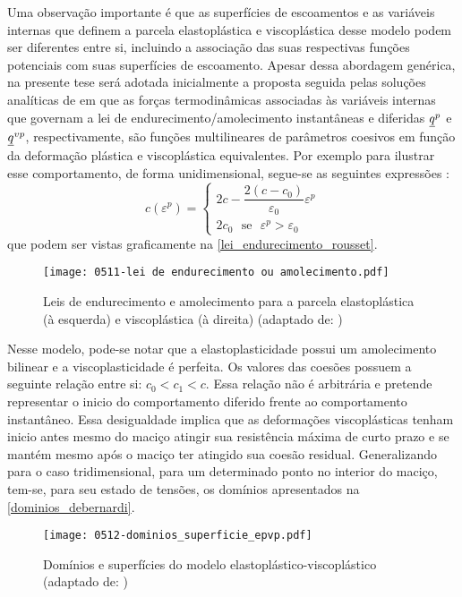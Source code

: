 Uma observação importante é que as superfícies de escoamentos e as variáveis internas que definem a parcela elastoplástica e viscoplástica desse modelo podem ser diferentes entre si, incluindo a associação das suas respectivas funções potenciais com suas superfícies de escoamento. Apesar dessa abordagem genérica, na presente tese será adotada inicialmente a proposta seguida pelas soluções analíticas de  em que as forças termodinâmicas associadas às variáveis internas que governam a lei de endurecimento/amolecimento instantâneas e diferidas $\underline q^p$ e $\underline q^{vp}$, respectivamente, são funções multilineares de parâmetros coesivos em função da deformação plástica e viscoplástica equivalentes. Por exemplo para ilustrar esse comportamento, de forma unidimensional, segue-se as seguintes expressões \cite[p. 220]{Rousset1988}:
\begin{equation}
	\label{eq:qp_rousset}
	c(\varepsilon^p) = \left\{
		\begin{array}{lcl}
			2c - \dfrac{2(c-c_0)}{\varepsilon_0}\varepsilon^p \\ 
			2c_0~~~\text{se}~~~\varepsilon^p > \varepsilon_0
		\end{array}
	\right.
\end{equation}
que podem ser vistas graficamente na \autoref{lei_endurecimento_rousset}.
\begin{figure}[H]
	\begin{center}
		\texttt{[image: 0511-lei de endurecimento ou amolecimento.pdf]}
	\end{center}
	\caption{\label{lei_endurecimento_rousset}Leis de endurecimento e amolecimento para a parcela elastoplástica (à esquerda) e viscoplástica (à direita) (adaptado de: )}
\end{figure}
Nesse modelo, pode-se notar que a elastoplasticidade possui um amolecimento bilinear e a viscoplasticidade é perfeita. Os valores das coesões possuem a seguinte relação entre si: $c_0 < c_1 < c$. Essa relação não é arbitrária e pretende representar o inicio do comportamento diferido frente ao comportamento instantâneo. Essa desigualdade implica que as deformações viscoplásticas tenham inicio antes mesmo do maciço atingir sua resistência máxima de curto prazo e se mantém mesmo após o maciço ter atingido sua coesão residual. Generalizando para o caso tridimensional, para um determinado ponto no interior do maciço, tem-se, para seu estado de tensões, os domínios apresentados na \autoref{dominios_debernardi}.
\begin{figure}[H]
	\begin{center}
		\texttt{[image: 0512-dominios\_superficie\_epvp.pdf]}
	\end{center}
	\caption{\label{dominios_debernardi}Domínios e superfícies do modelo elastoplástico-viscoplástico (adaptado de: )}
\end{figure}
